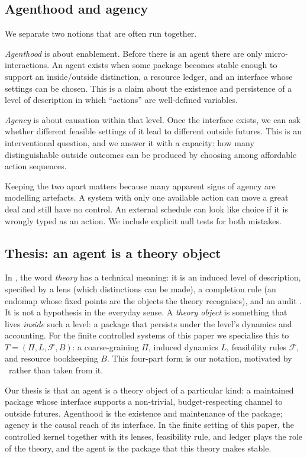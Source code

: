 \subsection{Agenthood and agency}
We separate two notions that are often run together.

\emph{Agenthood} is about enablement. Before there is an agent there are only micro-interactions. An agent exists when some package becomes stable enough to support an inside/outside distinction, a resource ledger, and an interface whose settings can be chosen. This is a claim about the existence and persistence of a level of description in which ``actions'' are well-defined variables.

\emph{Agency} is about causation within that level. Once the interface exists, we can ask whether different feasible settings of it lead to different outside futures. This is an interventional question, and we answer it with a capacity: how many distinguishable outside outcomes can be produced by choosing among affordable action sequences.

Keeping the two apart matters because many apparent signs of agency are modelling artefacts. A system with only one available action can move a great deal and still have no control. An external schedule can look like choice if it is wrongly typed as an action. We include explicit null tests for both mistakes.

\subsection{Thesis: an agent is a theory object}
In \SBT, the word \emph{theory} has a technical meaning: it is an induced level of description, specified by a lens (which distinctions can be made), a completion rule (an endomap whose fixed points are the objects the theory recognises), and an audit \citep{six_birds_theory}. It is not a hypothesis in the everyday sense. A \emph{theory object} is something that lives \emph{inside} such a level: a package that persists under the level's dynamics and accounting. For the finite controlled systems of this paper we specialise this to $T=(\Pi,L,\mathcal{F},B)$: a coarse-graining $\Pi$, induced dynamics $L$, feasibility rules $\mathcal{F}$, and resource bookkeeping $B$. This four-part form is our notation, motivated by \SBT\ rather than taken from it.

Our thesis is that an agent is a theory object of a particular kind: a maintained package whose interface supports a non-trivial, budget-respecting channel to outside futures. Agenthood is the existence and maintenance of the package; agency is the causal reach of its interface. In the finite setting of this paper, the controlled kernel together with its lenses, feasibility rule, and ledger plays the role of the theory, and the agent is the package that this theory makes stable.

